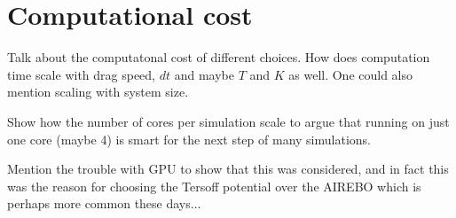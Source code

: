 \section{Computational cost}

Talk about the computatonal cost of different choices. How does computation time scale with drag speed, $dt$ and maybe $T$ and $K$ as well. One could also mention scaling with system size.

Show how the number of cores per simulation scale to argue that running on just one core (maybe 4) is smart for the next step of many simulations. 

Mention the trouble with GPU to show that this was considered, and in fact this was the reason for choosing the Tersoff potential over the AIREBO which is perhaps more common these days...
